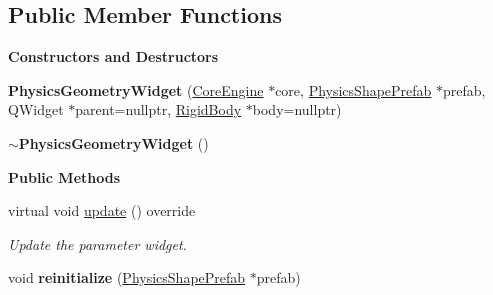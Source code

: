 \subsection*{Public Member Functions}
\begin{Indent}\textbf{ Constructors and Destructors}\par
\begin{DoxyCompactItemize}
\item 
\mbox{\label{classrev_1_1_view_1_1_physics_geometry_widget_a5d837a13c0200b0194f1f08c0f81266b}} 
{\bfseries Physics\+Geometry\+Widget} (\mbox{\hyperlink{classrev_1_1_core_engine}{Core\+Engine}} $\ast$core, \mbox{\hyperlink{classrev_1_1_physics_shape_prefab}{Physics\+Shape\+Prefab}} $\ast$prefab, Q\+Widget $\ast$parent=nullptr, \mbox{\hyperlink{classrev_1_1_rigid_body}{Rigid\+Body}} $\ast$body=nullptr)
\item 
\mbox{\label{classrev_1_1_view_1_1_physics_geometry_widget_acb3fa8d64de76132bca3e2778a5d35dc}} 
{\bfseries $\sim$\+Physics\+Geometry\+Widget} ()
\end{DoxyCompactItemize}
\end{Indent}
\begin{Indent}\textbf{ Public Methods}\par
\begin{DoxyCompactItemize}
\item 
\mbox{\label{classrev_1_1_view_1_1_physics_geometry_widget_a67c5e58136a6964d79261d73d50d6ca2}} 
virtual void \mbox{\hyperlink{classrev_1_1_view_1_1_physics_geometry_widget_a67c5e58136a6964d79261d73d50d6ca2}{update}} () override
\begin{DoxyCompactList}\small\item\em Update the parameter widget. \end{DoxyCompactList}\item 
\mbox{\label{classrev_1_1_view_1_1_physics_geometry_widget_afbe2f6b31c56a543cd80cb0228038704}} 
void {\bfseries reinitialize} (\mbox{\hyperlink{classrev_1_1_physics_shape_prefab}{Physics\+Shape\+Prefab}} $\ast$prefab)
\end{DoxyCompactItemize}
\end{Indent}
